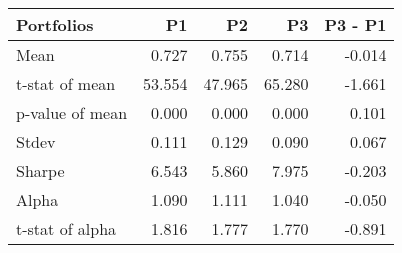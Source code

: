 \begin{tabular}{lrrrr}
\toprule
Portfolios & P1 & P2 & P3 & P3 - P1 \\
\midrule
Mean & 0.727 & 0.755 & 0.714 & -0.014 \\
t-stat of mean & 53.554 & 47.965 & 65.280 & -1.661 \\
p-value of mean & 0.000 & 0.000 & 0.000 & 0.101 \\
Stdev & 0.111 & 0.129 & 0.090 & 0.067 \\
Sharpe & 6.543 & 5.860 & 7.975 & -0.203 \\
Alpha & 1.090 & 1.111 & 1.040 & -0.050 \\
t-stat of alpha & 1.816 & 1.777 & 1.770 & -0.891 \\
\bottomrule
\end{tabular}
